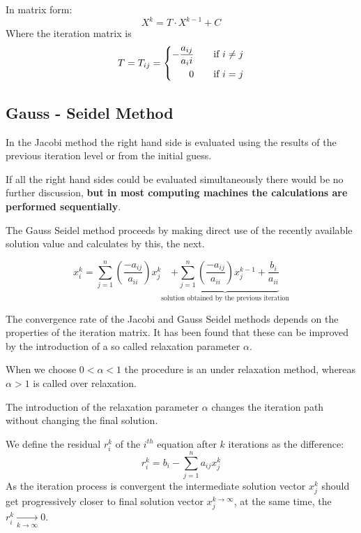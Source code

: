 \documentclass[a4paper, 15pt]{article}
\begin{document}
In matrix form:
\[X^k = T\cdot X^{k-1} + C\]
Where the iteration matrix is
\[T=T_{ij} = \begin{dcases}
	\begin{aligned}
		- \dfrac{a_{ij}}{a_ii} &\qquad \text{if}~i\ne j \\
	0 &\qquad \text{if}~i= j 
	\end{aligned}
\end{dcases}\]

\subsection{Gauss - Seidel Method}

In
the Jacobi method the right hand side is evaluated using the results of the previous iteration level or from the initial guess. 

If
all the right hand sides could be evaluated simultaneously there would be no further
discussion, \textbf{but in most computing machines the calculations are performed sequentially}. \newline 


\begin{tcolorbox}[colback=red!5!white,colframe=red!75!black,title=Take Home Message]
	The
	Gauss Seidel method proceeds by making direct use of the recently available solution value and calculates by this, the next. 
\end{tcolorbox}

\[x_i^k =\sum_{j=1}^{n}\left(\dfrac{-a_{ij}}{a_{ii}}\right){x_j^{k}} \underbrace{+\sum_{j=1}^{n}\left(\dfrac{-a_{ij}}{a_{ii}}\right){x_j^{k-1}} + \dfrac{b_i}{a_{ii}}}_{\text{solution obtained by the previous iteration}}\]


The
convergence rate of the Jacobi and Gauss Seidel methods depends on the properties of the
iteration matrix.
It
has been found that these can be improved by the introduction of a so called relaxation
parameter $\alpha$. 

When
we choose $0<\alpha<1$ the procedure is an under relaxation method, whereas $\alpha>1$ is called
over relaxation. 

The
introduction of the relaxation parameter $\alpha$ changes the iteration path without changing the
final solution. \newline 

We
define the residual $r_i^k$ of the $i^{th}$ equation after $k$ iterations as the difference:
\[r_i^k = b_i - \sum_{j=1}^na_{ij}x_j^k\]
As
the iteration process is convergent the intermediate solution vector $x_j^k$ should get
progressively closer to final solution vector $x_j^{k\rightarrow\infty}$, at the same time, the $r_i^k \underset{k\rightarrow\infty}{\rightarrow} 0$. 
\end{document}
